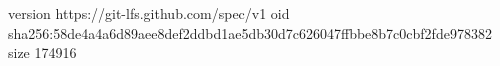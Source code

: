version https://git-lfs.github.com/spec/v1
oid sha256:58de4a4a6d89aee8def2ddbd1ae5db30d7c626047ffbbe8b7c0cbf2fde978382
size 174916
